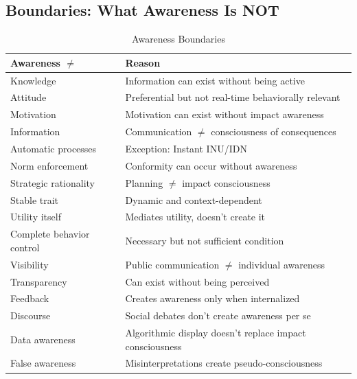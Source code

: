 \subsection{Boundaries: What Awareness Is NOT}
\label{subsec:awareness-boundaries}

\begin{table}[htbp]
\centering
\caption{Awareness Boundaries}
\label{tab:awareness-boundaries}
\renewcommand{\arraystretch}{1.3}
\begin{tabular}{@{}ll@{}}
\toprule
\textbf{Awareness $\neq$} & \textbf{Reason} \\
\midrule
Knowledge & Information can exist without being active \\
Attitude & Preferential but not real-time behaviorally relevant \\
Motivation & Motivation can exist without impact awareness \\
Information & Communication $\neq$ consciousness of consequences \\
Automatic processes & Exception: Instant INU/IDN \\
Norm enforcement & Conformity can occur without awareness \\
Strategic rationality & Planning $\neq$ impact consciousness \\
Stable trait & Dynamic and context-dependent \\
Utility itself & Mediates utility, doesn't create it \\
Complete behavior control & Necessary but not sufficient condition \\
Visibility & Public communication $\neq$ individual awareness \\
Transparency & Can exist without being perceived \\
Feedback & Creates awareness only when internalized \\
Discourse & Social debates don't create awareness per se \\
Data awareness & Algorithmic display doesn't replace impact consciousness \\
False awareness & Misinterpretations create pseudo-consciousness \\
\bottomrule
\end{tabular}
\end{table}

